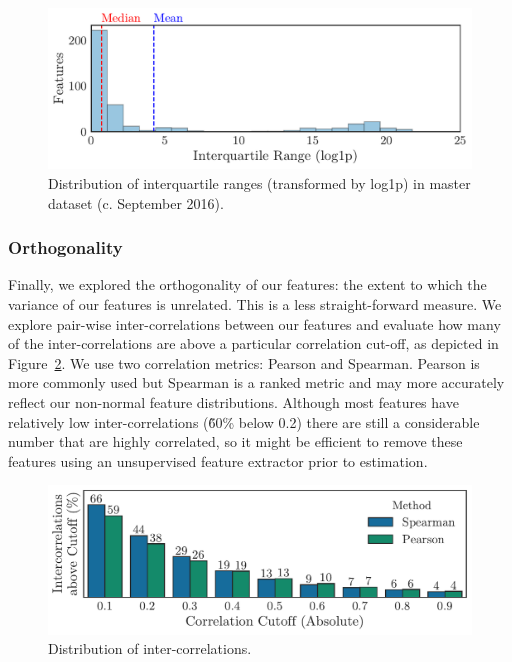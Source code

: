 \documentclass[../thesis/thesis.tex]{subfiles}
\begin{document}
\begin{figure}[!htb]
    \centering
    \includegraphics[width=\textwidth]{../figures/design/distribution_ranges}
    \caption[Distribution of interquartile ranges]{Distribution of interquartile ranges (transformed by log1p) in master dataset (c. September 2016).}
    \label{fig:design:scaling}
\end{figure}

\subsubsection{Orthogonality}

Finally, we explored the orthogonality of our features: the extent to which the variance of our features is unrelated. This is a less straight-forward measure. We explore pair-wise inter-correlations between our features and evaluate how many of the inter-correlations are above a particular correlation cut-off, as depicted in Figure~\ref{fig:design:orthogonality}. We use two correlation metrics: Pearson and Spearman. Pearson is more commonly used but Spearman is a ranked metric and may more accurately reflect our non-normal feature distributions. Although most features have relatively low inter-correlations (\~60\% below 0.2) there are still a considerable number that are highly correlated, so it might be efficient to remove these features using an unsupervised feature extractor prior to estimation.

\begin{figure}[!htb]
    \centering
    \includegraphics[width=\textwidth]{../figures/design/distribution_orthogonality}
    \caption[Distribution of inter-correlations]{Distribution of inter-correlations.}
    \label{fig:design:orthogonality}
\end{figure}
\end{document}
